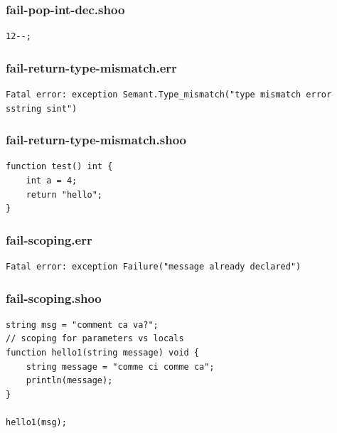 \documentclass[12pt]{article}
\begin{document}
\subsubsection{fail-pop-int-dec.shoo}
\begin{mdframed}[hidealllines=true,backgroundcolor=blue!10]
\begin{lstlisting}
12--;\end{lstlisting}
\end{mdframed}
\subsubsection{fail-return-type-mismatch.err}
\begin{mdframed}[hidealllines=true,backgroundcolor=green!10]
\begin{lstlisting}
Fatal error: exception Semant.Type_mismatch("type mismatch error sstring sint")\end{lstlisting}
\end{mdframed}
\subsubsection{fail-return-type-mismatch.shoo}
\begin{mdframed}[hidealllines=true,backgroundcolor=blue!10]
\begin{lstlisting}
function test() int {
	int a = 4;
	return "hello";
}\end{lstlisting}
\end{mdframed}
\subsubsection{fail-scoping.err}
\begin{mdframed}[hidealllines=true,backgroundcolor=green!10]
\begin{lstlisting}
Fatal error: exception Failure("message already declared")\end{lstlisting}
\end{mdframed}
\subsubsection{fail-scoping.shoo}
\begin{mdframed}[hidealllines=true,backgroundcolor=blue!10]
\begin{lstlisting}
string msg = "comment ca va?";
// scoping for parameters vs locals
function hello1(string message) void {
	string message = "comme ci comme ca";
	println(message);
}

hello1(msg);\end{lstlisting}
\end{mdframed}
\end{document}
